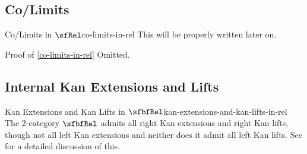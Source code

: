 \subsection{Co/Limits}\label{subsection-co-limits-in-rel}
\begin{proposition}{Co/Limits in $\sfRel$}{co-limits-in-rel}%
    This will be properly written later on.
\end{proposition}
\begin{Proof}{Proof of \cref{co-limits-in-rel}}%
    Omitted.
\end{Proof}
\subsection{Internal Kan Extensions and Lifts}\label{subsection-internal-kan-extensions-and-lifts-in-rel}
\begin{remark}{Kan Extensions and Kan Lifts in $\sfbfRel$}{kan-extensions-and-kan-lifts-in-rel}%
    The $2$-category $\sfbfRel$ admits all right Kan extensions and right Kan lifts, though not all left Kan extensions and neither does it admit all left Kan lifts. See  for a detailed discussion of this.
\end{remark}
